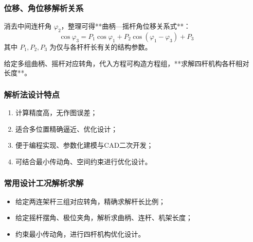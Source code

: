 \subsubsection{位移、角位移解析关系}
消去中间连杆角 $\varphi_2$，整理可得**曲柄—摇杆角位移关系式**：
\[
\cos\varphi_3 = P_1\cos\varphi_1 + P_2\cos(\varphi_1-\varphi_3) + P_3
\]
其中 $P_1,P_2,P_3$ 为仅与各杆杆长有关的结构参数。

给定多组曲柄、摇杆对应转角，代入方程可构造方程组，**求解四杆机构各杆相对长度**。

\subsubsection{解析法设计特点}
\begin{enumerate}
	\item 计算精度高，无作图误差；
	\item 适合多位置精确逼近、优化设计；
	\item 便于编程实现、参数化建模与CAD二次开发；
	\item 可结合最小传动角、空间约束进行优化设计。
\end{enumerate}

\subsubsection{常用设计工况解析求解}
\begin{itemize}
	\item 给定两连架杆三组对应转角，精确求解杆长比例；
	\item 给定摇杆摆角、极位夹角，解析求曲柄、连杆、机架长度；
	\item 约束最小传动角，进行四杆机构优化设计。
\end{itemize}